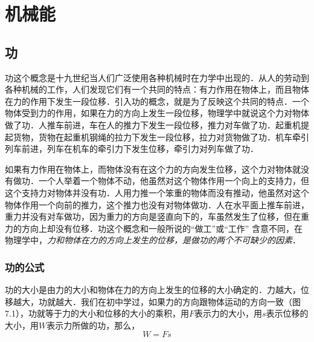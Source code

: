 
	
\chapter{机械能}
\section{功}

功这个概念是十九世纪当人们广泛使用各种机械时在力学中出现的．从人的劳动到各种机械的工作，人们发现它们有一个共同的特点：有力作用在物体上，而且物体在力的作用下发生一段位移．引入功的概念，就是为了反映这个共同的特点．一个物体受到力的作用，如果在力的方向上发生一段位移，物理学中就说这个力对物体做了功．人推车前进，车在人的推力下发生一段位移，推力对车做了功．起重机提起货物，货物在起重机钢绳的拉力下发生一段位移，拉力对货物做了功．机车牵引列车前进，列车在机车的牵引力下发生位移，牵引力对列车做了功．

如果有力作用在物体上，而物体没有在这个力的方向发生位移，这个力对物体就没有做功．一个人举着一个物体不动，他虽然对这个物体作用一个向上的支持力，但这个支持力对物体并没有功．人用力推一个笨重的物体而没有推动，他虽然对这个物体作用一个向前的推力，这个推力也没有对物体做功．人在水平面上推车前进，重力并没有对车做功，因为重力的方向是竖直向下的，车虽然发生了位移，但在重力的方向上却没有位移．功这个概念和一般所说的“做工”或“工作”
含意不同，在物理学中，\textit{力和物体在力的方向上发生的位移，是做功的两个不可缺少的因素}．

\subsection{功的公式} 

功的大小是由力的大小和物体在力的方向上发生的位移的大小确定的．力越大，位移越大，功就越大．我们在初中学过，如果力的方向跟物体运动的方向一致（图7.1），功就等于力的大小和位移的大小的乘积，用$F$表示力的大小，用$s$表示位移的大小，用$W$表示力所做的功，那么，
\[W=Fs\]

\begin{figure}[htp]\centering
{}
\caption{}
\end{figure}


